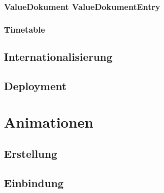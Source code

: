 \subsubsection*{ValueDokument ValueDokumentEntry}

\subsubsection*{Timetable}

\subsection{Internationalisierung}

\subsection{Deployment}

\section{Animationen}

\subsection{Erstellung}

\subsection{Einbindung}


